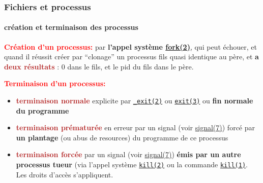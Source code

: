 \documentclass[xcolor=svgnames,final,smaller,a4]{beamer}
\begin{document}
\begin{frame}
  \frametitle{Fichiers et processus}
  \framesubtitle{création et terminaison des processus}

  \textbf{\textcolor{red}{Création d'un processus:}} par \textbf{l'appel
  système
  \href{https://man7.org/linux/man-pages/man2/fork.2.html}{fork(2)}},
  qui peut échouer, et quand il réussit créer par ``clonage'' un processus fils quasi
  identique au père, et \textbf{a \textcolor{FireBrick}{deux résultats}} : 0 dans le fils, et le pid
  du fils dans le père.

  \vspace{0.5cm}
  \textbf{\textcolor{red}{Terminaison d'un processus:}}

  \begin{itemize}
    \item \textbf{\textcolor{FireBrick}{terminaison normale}} explicite par
      \href{https://man7.org/linux/man-pages/man2/exit.2.html}{\texttt{\_exit(2)}} ou
      \href{https://man7.org/linux/man-pages/man3/exit.3.html}{\texttt{exit(3)}} ou \textbf{fin normale du programme}

    \item \textbf{\textcolor{FireBrick}{terminaison prématurée}} en
      erreur par un signal (voir
      \href{https://man7.org/linux/man-pages/man7/signal.7.html}{signal(7)})
      forcé par \textbf{un plantage} (ou abus de resources) du
      programme de ce processus {}
      
    \item \textbf{\textcolor{FireBrick}{terminaison forcée}} par un signal (voir 
  \href{https://man7.org/linux/man-pages/man7/signal.7.html}{signal(7)}) \textbf{émis par un autre processus tueur} (via 
     l'appel système \href{https://man7.org/linux/man-pages/man2/kill.2.html}{\texttt{kill(2)}} ou la commande \href{https://man7.org/linux/man-pages/man1/kill.1.html}{\texttt{kill(1)}}. Les droits d'accès s'appliquent.
  \end{itemize}
  
\end{frame}
\end{document}
